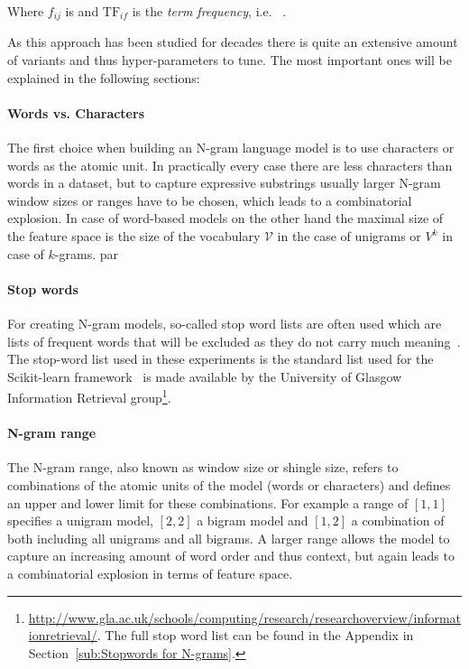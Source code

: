 Where $f_{ij}$ is  and $\text{TF}_{if}$ is the \emph{term frequency}, i.e.   ~\cite[Chapter 1.3.1, p.~8]{Leskovec:2014aa}.

As this approach has been studied for decades there is quite an extensive amount of variants and thus hyper-parameters to tune. The most important ones will be explained in the following sections:

\paragraph{Words vs. Characters} The first choice when building an N-gram language model is to use characters or words as the atomic unit. In practically every case there are less characters than words in a dataset, but to capture expressive substrings usually larger N-gram window sizes or ranges have to be chosen, which leads to a combinatorial explosion. In case of word-based models on the other hand the maximal size of the feature space is the size of the vocabulary $\mathcal{V}$ in the case of unigrams or $V^k$ in case of $k$-grams.
par
\paragraph{Stop words}
\label{par:Stop words}
For creating N-gram models, so-called stop word lists are often used which are lists of frequent words that will be excluded as they do not carry much meaning~\cite[Chapter 1.3.1, p.~7]{Leskovec:2014aa}. The stop-word list used in these experiments is the standard list used for the Scikit-learn framework~\cite{Pedregosa:2011aa} is made available by the University of Glasgow Information Retrieval group\footnote{\url{http://www.gla.ac.uk/schools/computing/research/researchoverview/informationretrieval/}. The full stop word list can be found in the Appendix in Section~\ref{sub:Stopwords for N-grams}.}.

\paragraph{N-gram range} The N-gram range, also known as window size or shingle size, refers to combinations of the atomic units of the model (words or characters) and defines an upper and lower limit for these combinations. For example a range of $[1,1]$ specifies a unigram model, $[2,2]$ a bigram model and $[1,2]$ a combination of both including all unigrams and all bigrams.
A larger range allows the model to capture an increasing amount of word order and thus context, but again leads to a combinatorial explosion in terms of feature space.

